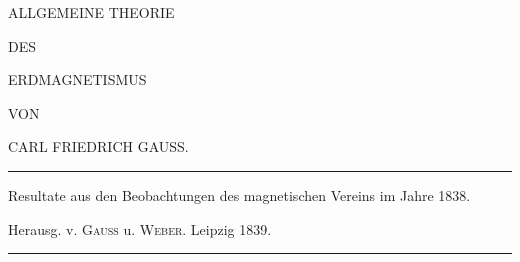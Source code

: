 \clearpage
\thispagestyle{empty}
\begin{center}
\vspace*{1in}
{\Large ALLGEMEINE THEORIE\par}
\bigskip
DES\par
\bigskip
{\LARGE{}ERDMAGNETISMUS\par}
\vspace{.5in}
{\small VON\par}
\bigskip
{\large{}CARL FRIEDRICH GAUSS.\par}
\vspace{1.0in}
\rule{.75\textwidth}{.3pt}\par
\medskip
{\small Resultate aus den Beobachtungen des magnetischen Vereins im Jahre 1838.\par
Herausg. v. \textsc{Gauss} u. \textsc{Weber}. Leipzig 1839.\par}
\medskip
\rule{.75\textwidth}{.3pt}\par
\end{center}
\clearpage
\thispagestyle{empty}\null
\clearpage
